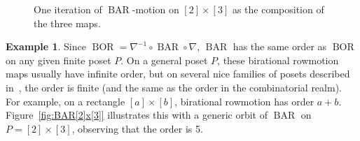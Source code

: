 \documentclass[10pt]{amsart}
\theoremstyle{definition}
\newtheorem{exam}[theo]{Example}
\newcommand{\down}{\nabla}
\DeclareMathOperator{\BAR}{BAR}
\DeclareMathOperator{\BOR}{BOR}
\begin{document}
\begin{figure}[htb]
\caption{One iteration of $\BAR$-motion on $[2]\times[3]$ as the composition of the three maps.}
\label{fig:2x3-BAR}
\end{figure}

\begin{exam}\label{ex:BAR[2]x[3]}
Since $\BOR=\down^{-1} \circ \BAR \circ \down$,
$\BAR$ has the same order as $\BOR$ on any given
finite poset $P$.
On a general poset $P$, these birational rowmotion maps usually have infinite order, but on several nice families of posets described in~\cite{GrRo15,GrRo16,hopkins2019minuscule}, the order is finite (and the same as the order in the combinatorial realm).
For example, on a rectangle $[a]\times[b]$,
birational rowmotion has order $a+b$.
Figure~\ref{fig:BAR[2]x[3]} illustrates this with a generic orbit of $\BAR$ on $P=[2]\times[3]$, observing that the order is 5.
\end{exam}
\end{document}
